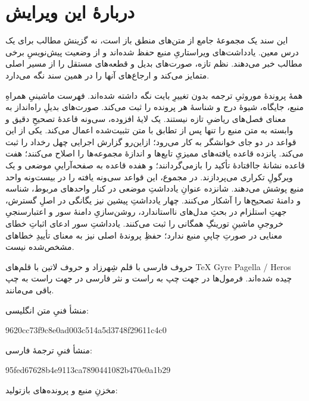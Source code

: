 \documentclass[openany]{memoir}
\begin{document}
\chapter*{دربارهٔ این ویرایش}
این سند یک مجموعهٔ جامع از متن‌های منطق باز است، نه گزینش مطالب برای یک
درس معین. یادداشت‌های ویراستاریِ منبع حفظ شده‌اند و از وضعیت پیش‌نویسِ
برخی مطالب خبر می‌دهند. نظم تازه، صورت‌های بدیل و قطعه‌های مستقل را از
مسیر اصلی متمایز می‌کند و ارجاع‌های آنها را در همین سند نگه می‌دارد.
\par\medskip
همهٔ  پروندهٔ موروثیِ ترجمه بدون تغییرِ بایت نگه داشته
شده‌اند. فهرست ماشینیِ همراهِ منبع، جایگاه، شیوهٔ درج و شناسهٔ هر پرونده
را ثبت می‌کند. صورت‌های بدیلِ راه‌انداز به معنای فصل‌های ریاضیِ تازه نیستند.
یک لایهٔ افزوده، سی‌ونه قاعدهٔ تصحیحِ دقیق و وابسته به متن منبع را تنها
پس از تطابق با متن تثبیت‌شده اعمال می‌کند. یکی از این قواعد در دو جای
خوانشگر به کار می‌رود؛ ازاین‌رو گزارش اجرایی چهل رخداد را ثبت می‌کند.
پانزده قاعده یافته‌های ممیزیِ تابع‌ها و اندازهٔ مجموعه‌ها را اصلاح می‌کنند؛
هفت قاعده نشانهٔ جاافتادهٔ تأکید را بازمی‌گردانند؛ و هفده قاعده به
صفحه‌آراییِ موضعی و یک ویرگولِ تکراری می‌پردازند. در مجموع، این قواعد
سی‌ونه یافته را در بیست‌ونه واحد منبع پوشش می‌دهند.
شانزده عنوانِ یادداشتِ موضعی در کنار واحدهای مربوط، شناسه و دامنهٔ
تصحیح‌ها را آشکار می‌کنند. چهار یادداشتِ پیشین نیز یگانگی در اصلِ گسترش،
جهتِ استلزام در بحثِ مدل‌های نااستاندارد، روشن‌سازیِ دامنهٔ سور و
اعتبارسنجیِ خروجیِ ماشینِ تورینگِ همگانی را ثبت می‌کنند. یادداشتِ سور
ادعای اثباتِ خطای معنایی در صورتِ چاپیِ منبع ندارد؛ حفظِ پروندهٔ اصلی نیز
به معنای تأییدِ خطاهای مشخص‌شده نیست.
\par\medskip
حروف فارسی با قلم شِهرزاد و حروف لاتین با قلم‌های
\foreignlanguage{english}{TeX Gyre Pagella / Heros} چیده شده‌اند.
فرمول‌ها در جهت چپ به راست و نثر فارسی در جهت راست به چپ باقی می‌مانند.
\par\medskip
\noindent منشأ فنیِ متن انگلیسی:
\begin{flushleft}\foreignlanguage{english}{\small\ttfamily
9620cc73f9c8e0ad003c514a5d3748f29611c4c0}\end{flushleft}
\noindent منشأ فنیِ ترجمهٔ فارسی:
\begin{flushleft}\foreignlanguage{english}{\small\ttfamily
95fed67628b4e9113ca7890441082b470e0a1b29}\end{flushleft}
\noindent مخزنِ منبع و پرونده‌های بازتولید:
\href{https://github.com/KokunoYumeto/OpenLogic-fa-ir}{}
\end{document}
